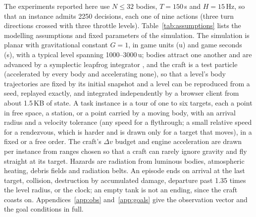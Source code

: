\documentclass[11pt]{article}
\begin{document}
The experiments reported here use $N \le 32$ bodies, $T = 150$\,s and
$H = 15$\,Hz, so that an instance admits 2250 decisions, each one of nine
actions (three turn directions crossed with three throttle levels).
Table~\ref{tab:assumptions} lists the modelling assumptions and fixed
parameters of the simulation. The simulation is planar with gravitational
constant $G = 1$, in game units (u) and game seconds (s), with a typical
level spanning 1000--3000\,u; bodies attract one another and are advanced by
a symplectic leapfrog integrator \cite{wisdom1991,rein2015}, and the craft
is a test particle (accelerated by every body and accelerating none), so
that a level's body trajectories are fixed by its initial snapshot and a
level can be reproduced from a seed, replayed exactly, and integrated
independently by a browser client from about 1.5\,KB of state. A task instance is a tour of
one to six targets, each a point in free space, a station, or a point carried
by a moving body, with an arrival radius and a velocity tolerance (any speed
for a flythrough; a small relative speed for a rendezvous, which is harder
and is drawn only for a target that moves), in a fixed or a free order. The
craft's $\Delta v$ budget and engine acceleration are drawn per instance
from ranges chosen so that a craft can rarely ignore gravity and fly
straight at its target. Hazards are radiation from luminous bodies,
atmospheric heating, debris fields and radiation belts. An episode ends on
arrival at the last target, collision, destruction by accumulated damage,
departure past 1.35 times the level radius, or the clock; an empty tank is
not an ending, since the craft coasts on. Appendices~\ref{app:obs}
and~\ref{app:goals} give the observation vector and the goal conditions in
full.


\end{document}
